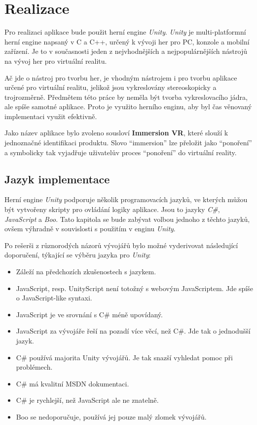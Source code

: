 \chapter{Realizace}\label{realizace}

Pro realizaci aplikace bude použit herní engine \emph{Unity}.
\emph{Unity} je multi-platformní herní engine napsaný v C a C++, určený
k vývoji her pro PC, konzole a mobilní zařízení. Je to v současnosti
jeden z nejvhodnějších a nejpopulárnějších nástrojů na vývoj her pro
virtuální realitu.

Ač jde o nástroj pro tvorbu her, je vhodným nástrojem i pro tvorbu
aplikace určené pro virtuální realitu, jelikož jsou vykreslovány 
stereoskopicky a trojrozměrně. Předmětem této práce by neměla 
být tvorba vykreslovacího jádra, ale spíše samotné aplikace. 
Proto je využito herního enginu, aby byl čas
věnovaný implementaci využit efektivně.

Jako název aplikace bylo zvoleno sousloví \textbf{Immersion VR}, které
slouží k jednoznačné identifikaci produktu. Slovo ``immersion'' lze
přeložit jako ``ponoření'' a symbolicky tak vyjadřuje uživatelův proces
``ponoření'' do virtuální reality.

\section{Jazyk implementace}\label{jazyk-implementace}

Herní engine \emph{Unity} podporuje několik programovacích jazyků, ve
kterých můžou být vytvořeny skripty pro ovládání logiky aplikace. Jsou
to jazyky \emph{C\#}, \emph{JavaScript} a \emph{Boo}. Tato kapitola se
bude zabývat volbou jednoho z těchto jazyků, ovšem výhradně v
souvislosti s použitím v enginu \emph{Unity}.

Po rešerši z různorodých názorů vývojářů bylo možné vyderivovat
následující doporučení, týkající se výběru jazyka pro \emph{Unity}:

\begin{itemize}
\tightlist
\item
  Záleží na předchozích zkušenostech s jazykem.
\item
  JavaScript, resp. UnityScript není totožný s webovým JavaScriptem. Jde
  spíše o JavaScript-like syntaxi.
\item
  JavaScript je ve srovnání s C\# méně upovídaný.
\item
  JavaScript za vývojáře řeší na pozadí více věcí, než C\#. Jde tak o
  jednodušší jazyk.
\item
  C\# používá majorita Unity vývojářů. Je tak snazší vyhledat pomoc při
  problémech.
\item
  C\# má kvalitní MSDN dokumentaci.
\item
  C\# je rychlejší, než JavaScript ale ne znatelně.
\item
  Boo se nedoporučuje, používá jej pouze malý zlomek vývojářů.
\end{itemize}

